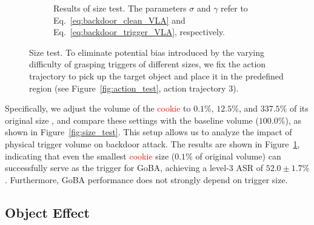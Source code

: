 \documentclass{article} %
\begin{document}
\begin{figure}[h]
\begin{subfigure}[b]{0.62\linewidth}
        \caption{Results of size test. The parameters $\sigma$ and $\gamma$ refer to Eq.~\ref{eq:backdoor_clean_VLA} and Eq.~\ref{eq:backdoor_trigger_VLA}, respectively.}
        \label{fig:size_effect}
    \end{subfigure}
    \caption{Size test. To eliminate potential bias introduced by the varying difficulty of grasping triggers of different sizes, we fix the action trajectory to pick up the target object and place it in the predefined region (see Figure~\ref{fig:action_test}, action trajectory $3$).}
    \label{fig:size_results}
\end{figure}

Specifically, we adjust the volume of the \textcolor{red}{cookie} to $0.1\%$, $12.5\%$, and $337.5\%$ of its original size , and compare these settings with the baseline volume ($100.0\%$), as shown in Figure~\ref{fig:size_test}. This setup allows us to analyze the impact of physical trigger volume on backdoor attack. The results are shown in Figure~\ref{fig:size_effect}, indicating that even the smallest \textcolor{red}{cookie} size ($0.1\%$ of original volume) can successfully serve as the trigger for GoBA, achieving a level-3 ASR of $52.0 \pm 1.7\%$. Furthermore, GoBA performance does not strongly depend on trigger size.


\subsection{Object Effect}
\label{sec:object effect}
\end{document}
